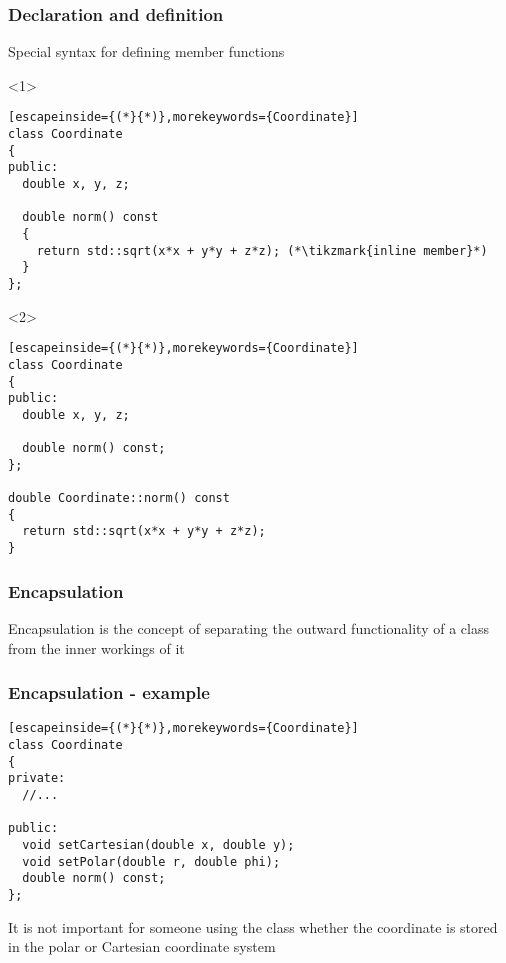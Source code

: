 \documentclass[14pt,a4paper,dvipsnames,usenames]{beamer}
\begin{document}
\begin{frame}[fragile]
  \frametitle{Declaration and definition}

  Special syntax for defining member functions

  \begin{overlayarea}{\textwidth}{6cm}
  \begin{onlyenv}<1>
    \begin{lstlisting}[escapeinside={(*}{*)},morekeywords={Coordinate}]
class Coordinate
{
public:
  double x, y, z;

  double norm() const
  {
    return std::sqrt(x*x + y*y + z*z); (*\tikzmark{inline member}*)
  }
};
    \end{lstlisting}

    \nointerlineskip
  \end{onlyenv}

  \begin{onlyenv}<2>
    \begin{lstlisting}[escapeinside={(*}{*)},morekeywords={Coordinate}]
class Coordinate
{
public:
  double x, y, z;

  double norm() const;
};

double Coordinate::norm() const
{
  return std::sqrt(x*x + y*y + z*z);
}
    \end{lstlisting}
  \end{onlyenv}
  \end{overlayarea}
  
\end{frame}

\begin{frame}
  \frametitle{Encapsulation}

  Encapsulation is the concept of separating the outward functionality of a class from the inner workings of it
  
\end{frame}

\begin{frame}[fragile]
  \frametitle{Encapsulation - example}

  \begin{lstlisting}[escapeinside={(*}{*)},morekeywords={Coordinate}]
class Coordinate
{
private:
  //...

public:
  void setCartesian(double x, double y);
  void setPolar(double r, double phi);
  double norm() const;
};
  \end{lstlisting}

  \vspace{.5em}
  {
    It is not important for someone using the class whether the coordinate
    is stored in the polar or Cartesian coordinate system
  }
  
\end{frame}
\end{document}
